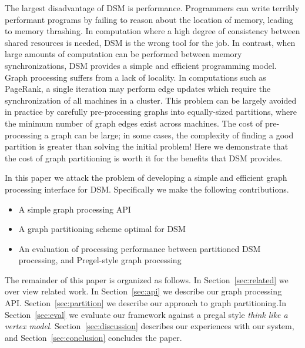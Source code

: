 The largest disadvantage of DSM is performance. Programmers can write
terribly performant programs by failing to reason about the location
of memory, leading to memory thrashing. In computation where a high
degree of consistency between shared resources is needed, DSM is the 
wrong tool for the job. In contrast, when large amounts of computation can be
performed between memory synchronizations, DSM provides a simple and
efficient programming model. Graph processing suffers from a lack of
locality. In computations such as PageRank, a single iteration may
perform edge updates which require the synchronization of all
machines in a cluster. This problem can be largely avoided in practice
by carefully pre-processing graphs into equally-sized partitions, where 
the minimum number of graph edges exist across machines. The cost of pre-processing a
graph can be large; in some cases, the complexity of finding a good
partition is greater than solving the initial problem! Here we
demonstrate that the cost of graph partitioning is worth it for the
benefits that DSM provides.

In this paper we attack the problem of developing a simple and
efficient graph processing interface for DSM. Specifically we make the
following contributions.

\begin{itemize}
        \item A simple graph processing API
        \item A graph partitioning scheme optimal for DSM
        \item An evaluation of processing performance between partitioned DSM processing, and Pregel-style graph processing
\end{itemize}

The remainder of this paper is organized as follows. In
Section~\ref{sec:related} we over view related work. In
Section~\ref{sec:api} we describe our graph processing API.
Section~\ref{sec:partition} we describe our approach to graph
partitioning.In Section~\ref{sec:eval} we evaluate our framework
against a pregal style \textit{think like a vertex model}.
Section~\ref{sec:discussion} describes our experiences with our
system, and Section~\ref{sec:conclusion} concludes the paper.




